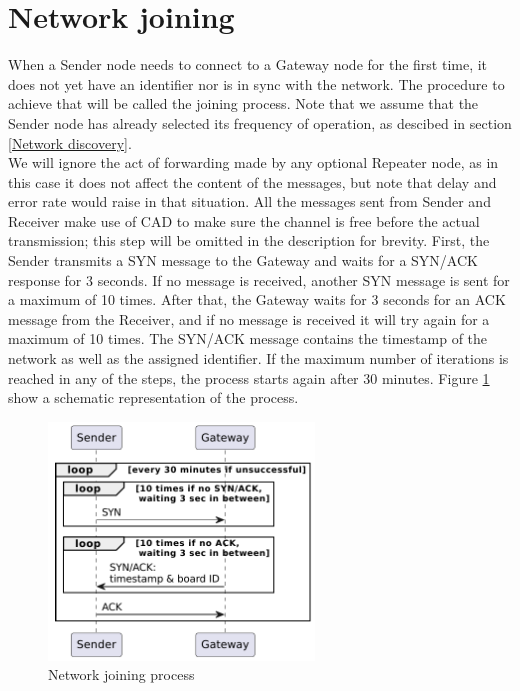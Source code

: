 \section{Network joining}
When a Sender node needs to connect to a Gateway node for the first time, it does not yet have an identifier nor is in
sync with the network. The procedure to achieve that will be called the joining process. Note that we assume that the
Sender node has already selected its frequency of operation, as descibed in section \ref{Network discovery}.\\
We will ignore the act of forwarding made by any optional Repeater node, as in this case it does not affect the
content of the messages, but note that delay and error rate would raise in that situation. All the messages sent from Sender
and Receiver make use of CAD to make sure the channel is free before the actual transmission; this step will be omitted
in the description for brevity. First, the Sender transmits a SYN message to the Gateway and waits for a SYN/ACK
response for 3 seconds. If no message is received, another SYN message is sent for a maximum of 10 times. After that,
the Gateway waits for 3 seconds for an ACK message from the Receiver, and if no message is received it will try again
for a maximum of 10 times. The SYN/ACK message contains the timestamp of the network as well as the assigned identifier.
If the maximum number of iterations is reached in any of the steps, the process starts again after 30 minutes.
Figure \ref{img: network joining} show a schematic representation of the process.

\begin{figure}[h]
    \centering
    \includegraphics[width=200pt]{uml/network_joining.pdf}
    \caption{Network joining process}
    \label{img: network joining}
\end{figure}

